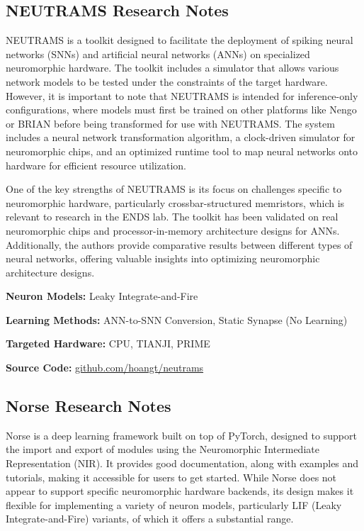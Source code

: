 \subsection*{NEUTRAMS Research Notes}\label{NEUTRAMS}

NEUTRAMS is a toolkit designed to facilitate the deployment of spiking neural networks (SNNs) and artificial neural networks (ANNs) on specialized neuromorphic hardware. The toolkit includes a simulator that allows various network models to be tested under the constraints of the target hardware. However, it is important to note that NEUTRAMS is intended for inference-only configurations, where models must first be trained on other platforms like Nengo or BRIAN before being transformed for use with NEUTRAMS. The system includes a neural network transformation algorithm, a clock-driven simulator for neuromorphic chips, and an optimized runtime tool to map neural networks onto hardware for efficient resource utilization.

One of the key strengths of NEUTRAMS is its focus on challenges specific to neuromorphic hardware, particularly crossbar-structured memristors, which is relevant to research in the ENDS lab. The toolkit has been validated on real neuromorphic chips and processor-in-memory architecture designs for ANNs. Additionally, the authors provide comparative results between different types of neural networks, offering valuable insights into optimizing neuromorphic architecture designs.

\begin{tcolorbox}[enhanced,attach boxed title to top center={yshift=-3mm,yshifttext=-1mm}, colback=blue!5!white,colframe=blue!75!black,colbacktitle=red!80!black, title=NEUTRAMS at a Glance,fonttitle=\bfseries, boxed title style={size=small,colframe=red!50!black} ]

\textbf{Neuron Models:} Leaky Integrate-and-Fire

\textbf{Learning Methods:} ANN-to-SNN Conversion, Static Synapse (No Learning)  

\textbf{Targeted Hardware:} CPU, TIANJI, PRIME 

\textbf{Source Code:} \href{https://github.com/hoangt/neutrams}{github.com/hoangt/neutrams}
\end{tcolorbox}
\subsection*{Norse Research Notes}\label{Norse}

Norse is a deep learning framework built on top of PyTorch, designed to support the import and export of modules using the Neuromorphic Intermediate Representation (NIR). It provides good documentation, along with examples and tutorials, making it accessible for users to get started. While Norse does not appear to support specific neuromorphic hardware backends, its design makes it flexible for implementing a variety of neuron models, particularly LIF (Leaky Integrate-and-Fire) variants, of which it offers a substantial range.

